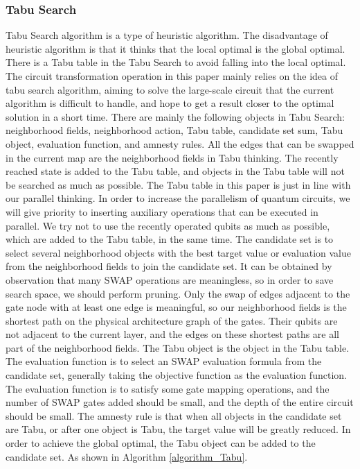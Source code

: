 \documentclass[runningheads]{llncs}
\begin{document}
\subsubsection{Tabu Search}
Tabu Search algorithm is a type of heuristic algorithm. 
The disadvantage of heuristic algorithm is that it thinks that the local optimal is the global optimal. 
There is a Tabu table in the Tabu Search to avoid falling into the local optimal.
The circuit transformation operation in this paper mainly relies on 
the idea of tabu search algorithm, 
aiming to solve the large-scale circuit that the current algorithm is difficult to handle, 
and hope to get a result closer to the optimal solution in a short time.
There are mainly the following objects in Tabu Search: neighborhood fields, neighborhood action, 
Tabu table, candidate set sum, Tabu object, evaluation function, and amnesty rules.
All the edges that can be swapped in the current map are the neighborhood fields in Tabu thinking.
The recently reached state is added to the Tabu table, 
and objects in the Tabu table will not be searched as much as possible. 
The Tabu table in this paper is just in line with our parallel thinking. 
In order to increase the parallelism of quantum circuits, we will give priority to inserting auxiliary operations 
that can be executed in parallel. We try not to use the recently operated qubits as much as possible, 
which are added to the Tabu table, in the same time.
The candidate set is to select several neighborhood objects with the best target value or evaluation value from the neighborhood fields
to join the candidate set. It can be obtained by observation that many SWAP operations are meaningless, 
so in order to save search space, we should perform pruning.
Only the swap of edges adjacent to the gate node with at least one edge is meaningful, 
so our neighborhood fields is the shortest path on the physical architecture graph of the gates. 
Their qubits are not adjacent to the current 
layer, and the edges on these shortest paths are all part of the neighborhood fields.
The Tabu object is the object in the Tabu table.
The evaluation function is to select an SWAP evaluation formula from the candidate set, 
generally taking the objective function as the evaluation function.
The evaluation function is to satisfy some gate mapping operations, 
and the number of SWAP gates added should be small, and the depth of the entire circuit should be small.
The amnesty rule is that when all objects in the candidate set are Tabu, 
or after one object is Tabu, the target value will be greatly reduced. 
In order to achieve the global optimal, the Tabu object can be added to the candidate set. 
As shown in Algorithm \ref{algorithm_Tabu}.
\end{document}
